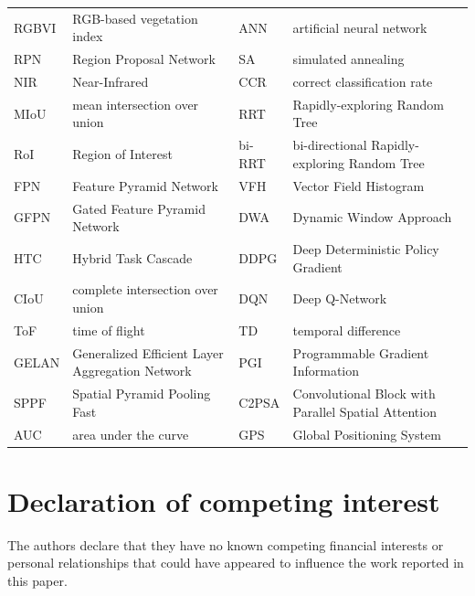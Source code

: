 \documentclass{ieeeaccess}
\begin{document}
\begin{table}[htbp]
\begin{center}
{\begin{tabular}{@{}p{}p{}@{\hspace{0.05\textwidth}}p{}p{}@{}}
RGBVI   & RGB-based vegetation index                                            & ANN     & artificial neural network \\
RPN     & Region Proposal Network                                               & SA      & simulated annealing \\
NIR     & Near-Infrared                                                         & CCR     & correct classification rate \\
MIoU    & mean intersection over union      									  & RRT     & Rapidly-exploring Random Tree \\
RoI     & Region of Interest                                                    & bi-RRT  & bi-directional Rapidly-exploring Random Tree \\
FPN     & Feature Pyramid Network                                               & VFH     & Vector Field Histogram \\
GFPN    & Gated Feature Pyramid Network                                         & DWA     & Dynamic Window Approach \\
HTC	    & Hybrid Task Cascade                                                   & DDPG    & Deep Deterministic Policy Gradient \\
CIoU    &  complete intersection over union                                     & DQN     & Deep Q-Network \\
ToF     & time of flight                                                        & TD      & temporal difference \\
GELAN	& Generalized Efficient Layer Aggregation Network					  	  & PGI		& Programmable Gradient Information \\
SPPF		& Spatial Pyramid Pooling Fast 										  & C2PSA	& Convolutional Block with Parallel Spatial Attention \\
AUC		& area under the curve 												  & GPS		& Global Positioning System \\

\bottomrule
\end{tabular}
}

\end{center}
\end{table}
\section*{Declaration of competing interest}
The authors declare that they have no known competing financial
interests or personal relationships that could have appeared
to influence the work reported in this paper.
\end{document}
